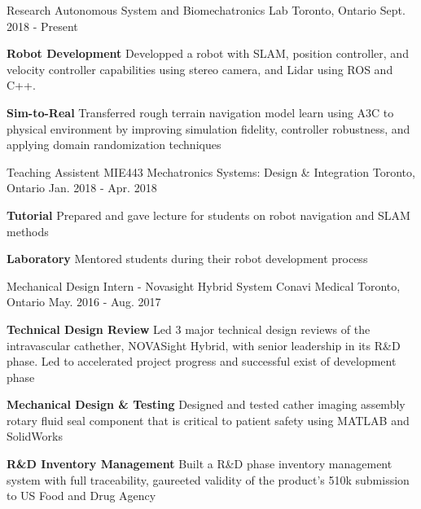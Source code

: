 \begin{cventries}
  \cventry
    {Research}
    {Autonomous System and Biomechatronics Lab}
    {Toronto, Ontario}
    {Sept. 2018 - Present}
    {
      \begin{cvitems}
        \item {
          \textbf{Robot Development} Developped a robot with SLAM, position controller, and velocity controller capabilities using stereo camera, and Lidar using ROS and C++. 
        }
        \item {
          \textbf{Sim-to-Real} Transferred rough terrain navigation model learn using A3C to physical environment by improving simulation fidelity, controller robustness, and applying domain randomization techniques
        }
      \end{cvitems}
    }
  \cventry
    {Teaching Assistent}
    {MIE443 Mechatronics Systems: Design \& Integration}
    {Toronto, Ontario}
    {Jan. 2018 - Apr. 2018}
    {
      \begin{cvitems}
        \item {
          \textbf{Tutorial} Prepared and gave lecture for students on robot navigation and SLAM methods
        }
        \item {
          \textbf{Laboratory} Mentored students during their robot development process
        }
      \end{cvitems}
    }
  \cventry
    {Mechanical Design Intern - Novasight Hybrid System}
    {Conavi Medical} 
    {Toronto, Ontario}
    {May. 2016 - Aug. 2017}
    {
      \begin{cvitems}
        \item {
          \textbf{Technical Design Review} Led 3 major technical design reviews of the intravascular cathether, NOVASight Hybrid, with senior leadership in its R\&D phase. Led to accelerated project progress and successful exist of development phase
        }
        \item {
            \textbf{Mechanical Design \& Testing} Designed and tested cather imaging assembly rotary fluid seal component that is critical to patient safety using MATLAB and SolidWorks
        }
        \item {
            \textbf{R\&D Inventory Management} Built a R\&D phase inventory management system with full traceability, gaureeted validity of the product's 510k submission to US Food and Drug Agency
        }
      \end{cvitems}
    }  
\end{cventries}
